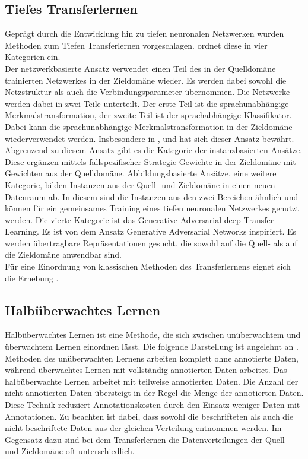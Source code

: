 		\subsection{Tiefes Transferlernen}
		Geprägt durch die Entwicklung hin zu tiefen neuronalen Netzwerken wurden Methoden zum Tiefen Transferlernen vorgeschlagen. \cite{Tan.2018} ordnet diese in vier Kategorien ein. \\
		Der netzwerkbasierte Ansatz verwendet einen Teil des in der Quelldomäne trainierten Netzwerkes in der Zieldomäne wieder. Es werden dabei sowohl die Netzstruktur als auch die Verbindungsparameter übernommen. Die Netzwerke werden dabei in zwei Teile unterteilt. Der erste Teil ist die sprachunabhängige Merkmalstransformation, der zweite Teil ist der sprachabhängige Klassifikator. Dabei kann die sprachunabhängige Merkmalstransformation in der Zieldomäne wiederverwendet werden. Insbesondere in \cite{JasonYosinski.2014}, \cite{Long.2016} und \cite{George.2018} hat sich dieser Ansatz bewährt. Abgrenzend zu diesem Ansatz gibt es die Kategorie der instanzbasierten Ansätze. Diese ergänzen mittels fallspezifischer Strategie Gewichte in der Zieldomäne mit Gewichten aus der Quelldomäne. Abbildungsbasierte Ansätze, eine weitere Kategorie, bilden Instanzen aus der Quell- und Zieldomäne in einen neuen Datenraum ab. In diesem sind die Instanzen aus den zwei Bereichen ähnlich und können für ein gemeinsames Training eines tiefen neuronalen Netzwerkes genutzt werden. Die vierte Kategorie ist das Generative Adversarial deep Transfer Learning. Es ist von dem Ansatz Generative Adversarial Networks \cite{IanJ.Goodfellow.2014} inspiriert. Es werden übertragbare Repräsentationen gesucht, die sowohl auf die Quell- als auf die Zieldomäne anwendbar sind. \\
		Für eine Einordnung von klassischen Methoden des Transferlernens eignet sich die Erhebung \cite{FuzhenZhuang.2019}.
		 
		\subsection{Halbüberwachtes Lernen}
		Halbüberwachtes Lernen ist eine Methode, die sich zwischen unüberwachtem und überwachtem Lernen einordnen lässt. Die folgende Darstellung ist angelehnt an \cite{Chapelle.2010} . Methoden des unüberwachten Lernens arbeiten komplett ohne annotierte Daten, während überwachtes Lernen mit vollständig annotierten Daten arbeitet. Das halbüberwachte Lernen arbeitet mit teilweise annotierten Daten. Die Anzahl der nicht annotierten Daten übersteigt in der Regel die Menge der annotierten Daten. Diese Technik reduziert Annotationskosten durch den Einsatz weniger Daten mit Annotationen. Zu beachten ist dabei, dass sowohl die beschrifteten als auch die nicht beschriftete Daten aus der gleichen Verteilung entnommen werden. 
		Im Gegensatz dazu sind bei dem Transferlernen die Datenverteilungen der Quell- und Zieldomäne oft unterschiedlich.
				
